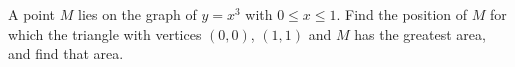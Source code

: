 A point $M$ lies on the graph of $y=x^3$ with $0\le x\le1$. Find the position of $M$ for which the triangle with vertices $(0,0)$, $(1,1)$ and $M$ has the greatest area, and find that area.
